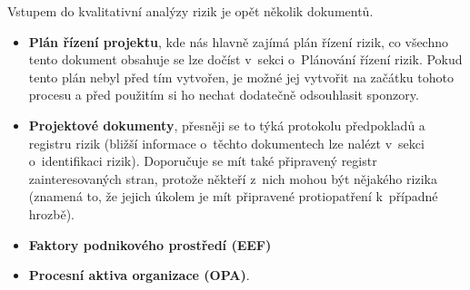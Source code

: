 Vstupem do kvalitativní analýzy rizik je opět několik dokumentů. 
\begin{itemize}
    \item \textbf{Plán řízení projektu}, kde nás hlavně zajímá plán řízení rizik, co všechno tento dokument obsahuje se lze dočíst v~sekci o~Plánování řízení rizik. Pokud tento plán nebyl před tím vytvořen, je možné jej vytvořit na začátku tohoto procesu a před použitím si ho nechat dodatečně odsouhlasit sponzory.
    \item \textbf{Projektové dokumenty}, přesněji se to týká protokolu předpokladů a registru rizik (bližší informace o~těchto dokumentech lze nalézt v~sekci o~identifikaci rizik). Doporučuje se mít také připravený registr zainteresovaných stran, protože někteří z~nich mohou být  nějakého rizika (znamená to, že jejich úkolem je mít připravené protiopatření k~případné hrozbě).
    \item \textbf{Faktory podnikového prostředí (EEF)}
    \item \textbf{Procesní aktiva organizace (OPA)}.
\end{itemize}

